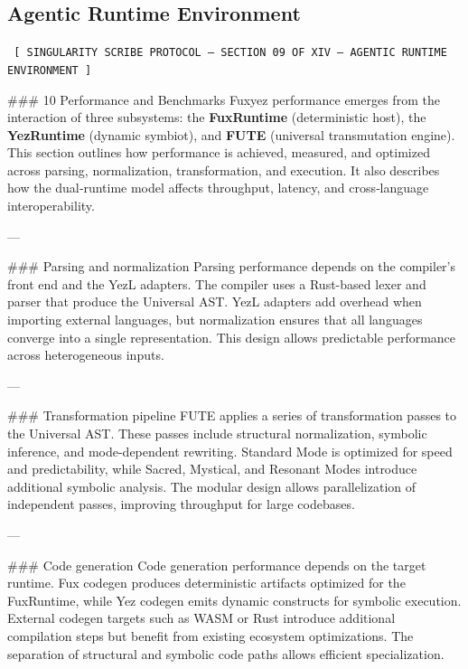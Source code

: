 \begin{enumerate}
    \chapter*{Agentic Runtime Environment}
    
    
    \begin{glyphbox}
    \centering
    \color{neonCyan}\fontsize{8}{10}\selectfont\texttt{
    [ SINGULARITY SCRIBE PROTOCOL -- SECTION 09 OF XIV -- AGENTIC RUNTIME ENVIRONMENT ]
    }
    \end{glyphbox}
    \vspace{0.3cm}
    
    
    \#\#\# 10 Performance and Benchmarks  
Fuxyez performance emerges from the interaction of three subsystems: the \textbf{FuxRuntime} (deterministic host), the \textbf{YezRuntime} (dynamic symbiot), and \textbf{FUTE} (universal transmutation engine). This section outlines how performance is achieved, measured, and optimized across parsing, normalization, transformation, and execution. It also describes how the dual‑runtime model affects throughput, latency, and cross‑language interoperability.

---

\#\#\# Parsing and normalization  
Parsing performance depends on the compiler’s front end and the YezL adapters. The compiler uses a Rust-based lexer and parser that produce the Universal AST. YezL adapters add overhead when importing external languages, but normalization ensures that all languages converge into a single representation. This design allows predictable performance across heterogeneous inputs.

---

\#\#\# Transformation pipeline  
FUTE applies a series of transformation passes to the Universal AST. These passes include structural normalization, symbolic inference, and mode-dependent rewriting. Standard Mode is optimized for speed and predictability, while Sacred, Mystical, and Resonant Modes introduce additional symbolic analysis. The modular design allows parallelization of independent passes, improving throughput for large codebases.

---

\#\#\# Code generation  
Code generation performance depends on the target runtime. Fux codegen produces deterministic artifacts optimized for the FuxRuntime, while Yez codegen emits dynamic constructs for symbolic execution. External codegen targets such as WASM or Rust introduce additional compilation steps but benefit from existing ecosystem optimizations. The separation of structural and symbolic code paths allows efficient specialization.


\end{enumerate}
